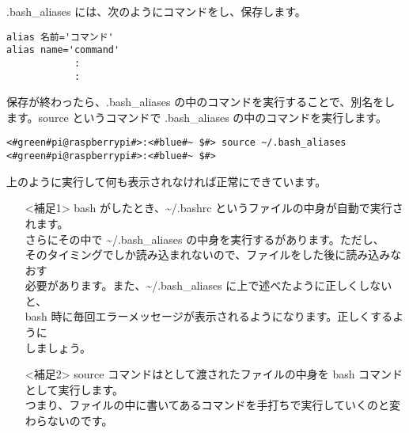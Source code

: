 .bash{\_}aliases には、次のようにコマンドをし、保存します。
\begin{lstlisting}[caption=\textasciitilde/.bash\_aliasesの書き方1, label=bashAliasesGrammar1]
alias 名前='コマンド'
alias name='command'
            :
            :
\end{lstlisting}

保存が終わったら、.bash{\_}aliases の中のコマンドを実行することで、別名をします。source というコマンドで .bash{\_}aliases の中のコマンドを実行します。
\begin{lstlisting}[caption=\textasciitilde/.bash\_aliasesの読込, label=sourceBashAliases]
<#green#pi@raspberrypi#>:<#blue#~ $#> source ~/.bash_aliases
<#green#pi@raspberrypi#>:<#blue#~ $#>
\end{lstlisting}

上のように実行して何も表示されなければ正常にできています。


\begin{itemize}
    \item[<補足1>] bash がしたとき、\textasciitilde/.bashrc というファイルの中身が自動で実行されます。\\
    さらにその中で \textasciitilde/.bash{\_}aliases の中身を実行するがあります。ただし、\\
    そのタイミングでしか読み込まれないので、ファイルをした後に読み込みなおす\\
    必要があります。また、\textasciitilde/.bash{\_}aliases に上で述べたように正しくしないと、\\
    bash 時に毎回エラーメッセージが表示されるようになります。正しくするように\\
    しましょう。
    \item[<補足2>] source コマンドはとして渡されたファイルの中身を bash コマンドとして実行します。\\
    つまり、ファイルの中に書いてあるコマンドを手打ちで実行していくのと変わらないのです。
\end{itemize}

